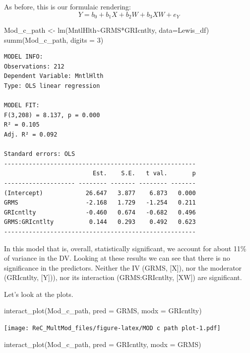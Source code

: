 \documentclass[
]{book}
\newenvironment{Shaded}{\begin{snugshade}}{\end{snugshade}}
\newcommand{\AttributeTok}[1]{\textcolor[rgb]{0.77,0.63,0.00}{#1}}
\newcommand{\DecValTok}[1]{\textcolor[rgb]{0.00,0.00,0.81}{#1}}
\newcommand{\FunctionTok}[1]{\textcolor[rgb]{0.00,0.00,0.00}{#1}}
\newcommand{\NormalTok}[1]{#1}
\newcommand{\OtherTok}[1]{\textcolor[rgb]{0.56,0.35,0.01}{#1}}
\newcommand{\SpecialCharTok}[1]{\textcolor[rgb]{0.00,0.00,0.00}{#1}}
\begin{document}
As before, this is our formulaic rendering:\\
\[Y=b_{0}+b_{1}X+b_{2}W+b_{3}XW+e_{Y}\]

\begin{Shaded}
\begin{Highlighting}[]
\NormalTok{Mod\_c\_path }\OtherTok{\textless{}{-}} \FunctionTok{lm}\NormalTok{(MntlHlth}\SpecialCharTok{\textasciitilde{}}\NormalTok{GRMS}\SpecialCharTok{*}\NormalTok{GRIcntlty, }\AttributeTok{data=}\NormalTok{Lewis\_df)}
\FunctionTok{summ}\NormalTok{(Mod\_c\_path, }\AttributeTok{digits =} \DecValTok{3}\NormalTok{)}
\end{Highlighting}
\end{Shaded}

\begin{verbatim}
MODEL INFO:
Observations: 212
Dependent Variable: MntlHlth
Type: OLS linear regression 

MODEL FIT:
F(3,208) = 8.137, p = 0.000
R² = 0.105
Adj. R² = 0.092 

Standard errors: OLS
------------------------------------------------------
                         Est.    S.E.   t val.       p
-------------------- -------- ------- -------- -------
(Intercept)            26.647   3.877    6.873   0.000
GRMS                   -2.168   1.729   -1.254   0.211
GRIcntlty              -0.460   0.674   -0.682   0.496
GRMS:GRIcntlty          0.144   0.293    0.492   0.623
------------------------------------------------------
\end{verbatim}

In this model that is, overall, statistically significant, we account for about 11\% of variance in the DV. Looking at these results we can see that there is no significance in the predictors. Neither the IV (GRMS, {[}X{]}), nor the moderator (GRIcntlty, {[}Y{]})), nor its interaction (GRMS:GRIcntlty, {[}XW{]}) are significant.

Let's look at the plots.

\begin{Shaded}
\begin{Highlighting}[]
\FunctionTok{interact\_plot}\NormalTok{(Mod\_c\_path, }\AttributeTok{pred =}\NormalTok{ GRMS, }\AttributeTok{modx =}\NormalTok{ GRIcntlty)}
\end{Highlighting}
\end{Shaded}

\texttt{[image: ReC\_MultMod\_files/figure-latex/MOD c path plot-1.pdf]}

\begin{Shaded}
\begin{Highlighting}[]
\FunctionTok{interact\_plot}\NormalTok{(Mod\_c\_path, }\AttributeTok{pred =}\NormalTok{ GRIcntlty, }\AttributeTok{modx =}\NormalTok{ GRMS)}
\end{Highlighting}
\end{Shaded}
\end{document}
